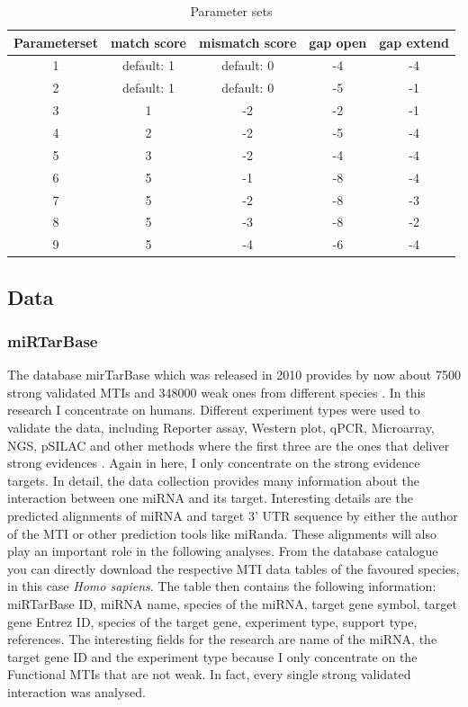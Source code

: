 \documentclass[12pt]{article}
\begin{document}
\begin{table}
\caption{Parameter sets}
\vspace{0.3cm}
\begin{tabular}{c|c|c|c|c}
Parameterset & match score & mismatch score & gap open & gap extend\\
\hline\hline 
1 & default: 1 & default: 0 & -4 & -4\\
2 &  default: 1 & default: 0 & -5 & -1 \\
3 &  1 & -2 & -2 & -1 \\
4 &  2 & -2 & -5 & -4 \\
5 &  3 & -2 & -4 & -4 \\
6 &  5 & -1 & -8 & -4 \\
7 &  5 & -2 & -8 & -3 \\
8 &  5 & -3 & -8 & -2 \\
9 &  5 & -4 & -6 & -4 \\
\hline
\end{tabular}
\label{table:parameter}
\end{table}

 
\subsection{Data} 
\subsubsection{miRTarBase}
The database mirTarBase which was released in 2010 provides by now about 7500 strong validated MTIs and 348000 weak ones from different species \cite{Chou}. In this research I concentrate on humans. Different experiment types were used to validate the data, including Reporter assay, Western plot, qPCR, Microarray, NGS, pSILAC and other methods where the first three are the ones that deliver strong evidences \cite{Hsu}. Again in here, I only concentrate on the strong evidence targets. In detail, the data collection provides many information about the interaction between one miRNA and its target. Interesting details are the predicted alignments of miRNA and target 3' UTR sequence by either the author of the MTI or other prediction tools like miRanda. These alignments will also play an important role in the following analyses. From the database catalogue you can directly download the respective MTI data tables of the favoured species, in this case \textit{Homo sapiens}. The table then contains the following information: miRTarBase ID, miRNA name, species of the miRNA, target gene symbol, target gene Entrez ID, species of the target gene, experiment type, support type, references. The interesting fields for the research are name of the miRNA, the target gene ID and the experiment type because I only concentrate on the Functional MTIs that are not weak. In fact, every single strong validated interaction was analysed.
\end{document}

